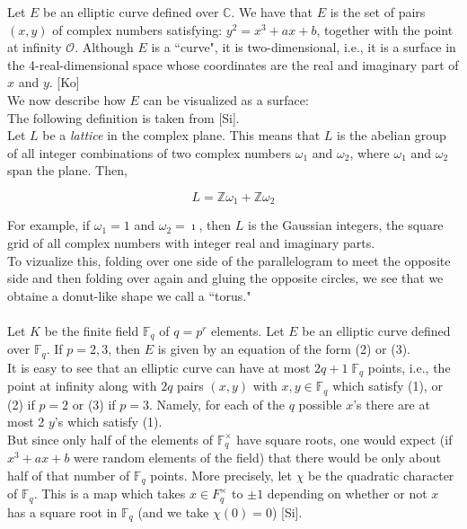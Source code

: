 \documentclass[12pt]{article}
\newcommand{\F}{\mathbb{F}}
\newcommand{\Z}{\mathbb{Z}}
\newcommand{\C}{\mathbb{C}}
\newcommand{\Oo}{\mathcal{O}}
\begin{document}
Let $E$ be an elliptic curve defined over $\C$. We have that $E$ is the set of pairs $(x,y)$ of complex numbers satisfying: $y^2 = x^3 + ax + b$, together with the point at infinity $\Oo$. Although $E$ is a ``curve", it is two-dimensional, i.e., it is a surface in the 4-real-dimensional space whose coordinates are the real and imaginary part of $x$ and $y$. [Ko] \\

We now describe how $E$ can be visualized as a surface: \\

The following definition is taken from [Si].\\

 Let $L$ be a \emph{lattice} in the complex plane. This means that $L$ is the abelian group of all integer combinations of two complex numbers $\omega_1$ and $\omega_2$, where $\omega_1$ and $\omega_2$ span the plane. Then, 

\begin{displaymath}
L = \Z\omega_1 + \Z\omega_2
\end{displaymath}

For example, if $\omega_1 = 1$ and $\omega_2 = \imath$, then $L$ is the Gaussian integers, the square grid of all complex numbers with integer real and imaginary parts. \\

To vizualize this, folding over one side of the parallelogram to meet the opposite side and then folding over again and gluing the opposite circles, we see that we obtaine a donut-like shape we call a ``torus."\\


\noindent {\bf Elliptic curves over $\F_q$.} \\

Let $K$ be the finite field $\F_q$ of $q = p^r$ elements. Let $E$ be an elliptic curve defined over $\F_q$. If $p=2,3$, then $E$ is given by an equation of the form (2) or (3). \\

It is easy to see that an elliptic curve can have at most $2q+1\;\F_q$ points, i.e., the point at infinity along with $2q$ pairs $(x,y)$ with $x,y \in \F_q$ which satisfy (1), or (2) if $p=2$ or (3) if $p=3$. Namely, for each of the $q$ possible $x$'s there are at most 2 $y$'s which satisfy (1). \\

But since only half of the elements of $\F_q^{\times}$ have square roots, one would expect (if $x^3 + ax + b$ were random elements of the field) that there would be only about half of that number of $\F_q$ points.  More precisely, let $\chi$ be the quadratic character of $\F_q$.  This is a map which takes $x \in F_{q}^{\times}$ to $\pm 1$ depending on whether or not $x$ has a square root in $\F_q$ (and we take $\chi(0) = 0$) [Si]. \\
\end{document}
